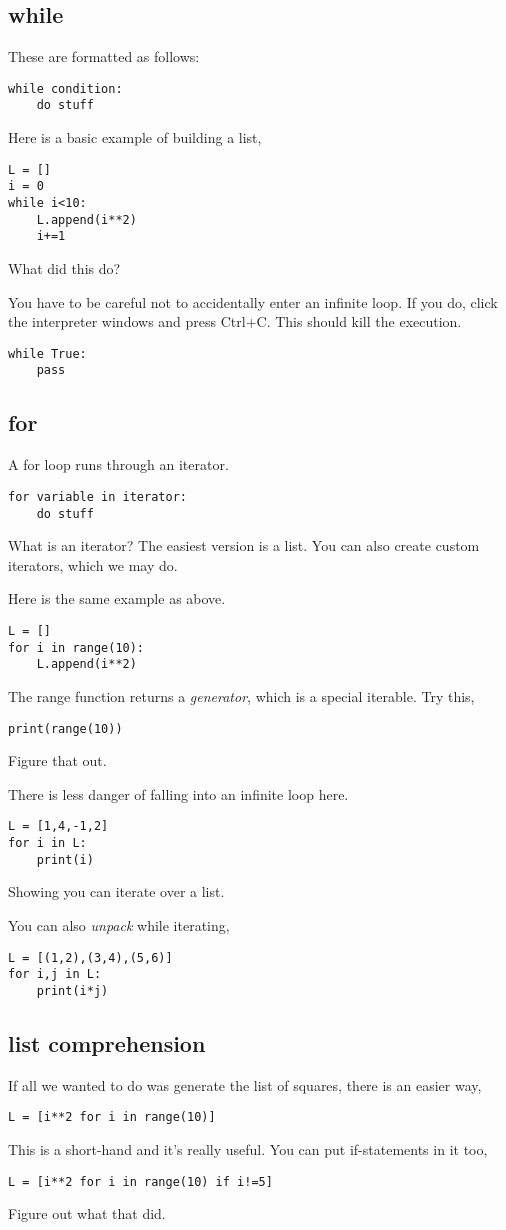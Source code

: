 \documentclass[11pt,letterpaper]{article}
\begin{document}
\subsection{while}
These are formatted as follows:
\begin{verbatim}
while condition:
    do stuff
\end{verbatim}

Here is a basic example of building a list,
\begin{verbatim}
L = []
i = 0
while i<10:
    L.append(i**2)
    i+=1
\end{verbatim}
What did this do?

You have to be careful not to accidentally enter an infinite loop. If you do, click the interpreter
windows and press Ctrl+C. This should kill the execution.
\begin{verbatim}
while True:
    pass
\end{verbatim}


\subsection{for}
A for loop runs through an iterator.
\begin{verbatim}
for variable in iterator:
    do stuff
\end{verbatim}
What is an iterator? The easiest version is a list. You can also create custom iterators, which 
we may do. 

Here is the same example as above.
\begin{verbatim}
L = []
for i in range(10):
    L.append(i**2)
\end{verbatim}
The range function returns a \emph{generator}, which is a special iterable. Try this,
\begin{verbatim}
print(range(10))
\end{verbatim}
Figure that out.

There is less danger of falling into an infinite loop here. 

\begin{verbatim}
L = [1,4,-1,2]
for i in L:
    print(i)
\end{verbatim}
Showing you can iterate over a list.


You can also \emph{unpack} while iterating,
\begin{verbatim}
L = [(1,2),(3,4),(5,6)]
for i,j in L:
    print(i*j)
\end{verbatim}


\subsection{list comprehension}
If all we wanted to do was generate the list of squares, there is an easier way,
\begin{verbatim}
L = [i**2 for i in range(10)]
\end{verbatim}
This is a short-hand and it's really useful. You can put if-statements in it too,
\begin{verbatim}
L = [i**2 for i in range(10) if i!=5]
\end{verbatim}
Figure out what that did.
\end{document}
